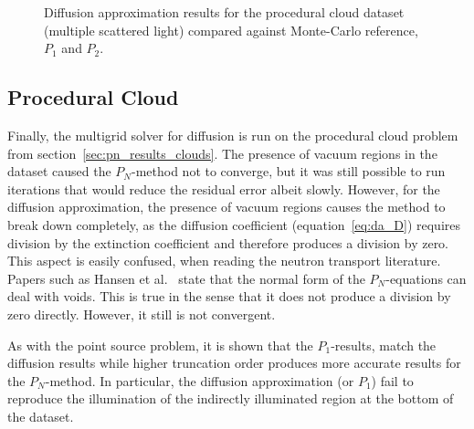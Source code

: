 \begin{figure}[h]
\caption{Diffusion approximation results for the procedural cloud dataset (multiple scattered light) compared against Monte-Carlo reference, $P_1$ and $P_2$.}
\label{fig:da_results_nebulae_1}
\end{figure}

\subsection{Procedural Cloud}
\label{sec:da_results_clouds}

Finally, the multigrid solver for diffusion is run on the procedural cloud problem from section~\ref{sec:pn_results_clouds}. The presence of vacuum regions in the dataset caused the $P_N$-method not to converge, but it was still possible to run iterations that would reduce the residual error albeit slowly. However, for the diffusion approximation, the presence of vacuum regions causes the method to break down completely, as the diffusion coefficient (equation~\ref{eq:da_D}) requires division by the extinction coefficient and therefore produces a division by zero. This aspect is easily confused, when reading the neutron transport literature. Papers such as Hansen et al.~\cite{Hansen14} state that the normal form of the $P_N$-equations can deal with voids. This is true in the sense that it does not produce a division by zero directly. However, it still is not convergent.

As with the point source problem, it is shown that the $P_1$-results, match the diffusion results while higher truncation order produces more accurate results for the $P_N$-method. In particular, the diffusion approximation (or $P_1$) fail to reproduce the illumination of the indirectly illuminated region at the bottom of the dataset.
